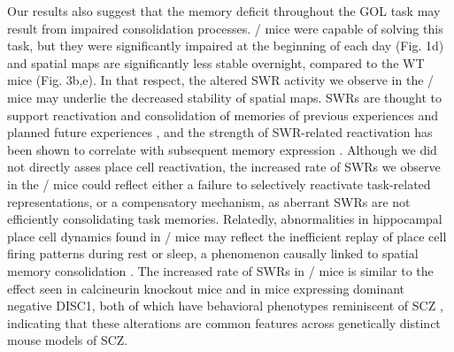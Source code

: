 Our results also suggest that the memory deficit throughout the GOL task may result from impaired consolidation processes. \df/ mice were capable of solving this task, but they were significantly impaired at the beginning of each day (Fig. 1d) and spatial maps are significantly less stable overnight, compared to the WT mice (Fig. 3b,e). In that respect, the altered SWR activity we observe in the \df/ mice may underlie the decreased stability of spatial maps.  SWRs are thought to support reactivation and consolidation of memories of previous experiences and planned future experiences \citep{Buzsaki2015, Diba2007, Foster2006, Jadhav2012, Kudrimoti1999}, and the strength of SWR-related reactivation has been shown to correlate with subsequent memory expression \citep{Dupret2010a}. Although we did not directly asses place cell reactivation, the increased rate of SWRs we observe in the \df/ mice could reflect either a failure to selectively reactivate task-related representations, or a compensatory mechanism, as aberrant SWRs are not efficiently consolidating task memories. Relatedly, abnormalities in hippocampal place cell dynamics found in \df/ mice may reflect the inefficient replay of place cell firing patterns during rest or sleep, a phenomenon causally linked to spatial memory consolidation \citep{DeLavilleon2015}. The increased rate of SWRs in \df/ mice is similar to the effect seen in calcineurin knockout mice and in mice expressing dominant negative DISC1, both of which have behavioral phenotypes reminiscent of SCZ \citep{Altimus2015, Suh2013}, indicating that these alterations are common features across genetically distinct mouse models of SCZ.

